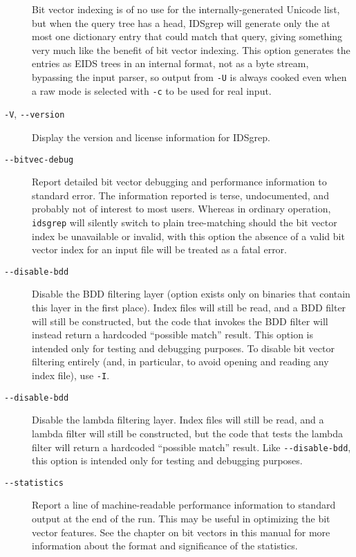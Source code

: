 \documentclass[twocolumn]{report}
\newcommand{\DangerousBend}{\marginpar{\large\hfill\dbend\hfill\null}}
\begin{document}
\begin{description}
Bit \DangerousBend vector indexing is of no use for the internally-generated
Unicode list, but when the query tree has a head, IDSgrep will generate
only the at most one dictionary entry that could match that query, giving
something very much like the benefit of bit vector indexing.
This option generates the entries as EIDS trees in an internal format,
not as a byte stream, bypassing the input parser,
so output from \texttt{-U}
is always cooked even when a raw mode is selected with
\texttt{-c} to be used for real input.

\item[\texttt{-V}, \texttt{-{}-version}] Display the version and license
information for IDSgrep.

\item[\texttt{-{}-bitvec-debug}]
Report \DangerousBend detailed bit vector debugging and performance
information to standard error.
The information reported is terse, undocumented, and probably not of
interest to most users.
Whereas in ordinary operation, \texttt{idsgrep}
will silently switch to plain tree-matching should the bit vector index
be unavailable or invalid, with this option the
absence of a valid bit vector index for an input file will be
treated as a fatal error.

\item[\texttt{-{}-disable-bdd}]
Disable \DangerousBend the BDD filtering layer (option exists only on
binaries that contain this layer in the first place).
Index files will still be read, and a BDD filter will still be
constructed, but the code that invokes the BDD filter will instead
return a hardcoded ``possible match'' result.
This option is intended only for testing and debugging purposes.
To disable bit vector filtering entirely (and, in particular, to
avoid opening and reading any index file), use \texttt{-I}.

\item[\texttt{-{}-disable-bdd}]
Disable \DangerousBend the lambda filtering layer.
Index files will still be read, and a lambda filter will still be
constructed, but the code that tests the lambda filter
will return a hardcoded ``possible match'' result.
Like \texttt{-{}-disable-bdd},
this option is intended only for testing and debugging purposes.

\item[\texttt{-{}-statistics}]
Report \DangerousBend a line of machine-readable performance information
to standard output at the end of the run.  This may be useful in
optimizing the bit vector features.  See the chapter on bit vectors in this
manual for more information about the format and significance of the
statistics.

\end{description}
\end{document}
